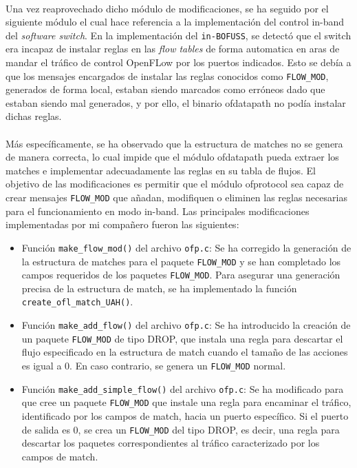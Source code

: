 \\
Una vez reaprovechado dicho módulo de modificaciones, se ha seguido por el siguiente módulo el cual hace referencia a la implementación del control in-band del \textit{software switch}. En la implementación del \texttt{in-BOFUSS}, se detectó que el switch era incapaz de instalar reglas en las \textit{flow tables} de forma automatica en aras de mandar el tráfico de control OpenFLow por los puertos indicados. Esto se debía a que los mensajes encargados de instalar las reglas conocidos como \texttt{FLOW\_MOD}, generados de forma local, estaban siendo marcados como erróneos dado que estaban siendo mal generados, y por ello, el binario ofdatapath no podía instalar dichas reglas.\\
\\
Más específicamente, se ha observado que la estructura de matches no se genera de manera correcta, lo cual impide que el módulo ofdatapath pueda extraer los matches e implementar adecuadamente las reglas en su tabla de flujos. El objetivo de las modificaciones es permitir que el módulo ofprotocol sea capaz de crear mensajes \texttt{FLOW\_MOD} que añadan, modifiquen o eliminen las reglas necesarias para el funcionamiento en modo in-band. Las principales modificaciones implementadas por mi compañero fueron las siguientes:

\begin{itemize}
    \item Función \texttt{make\_flow\_mod()} del archivo \texttt{ofp.c}: Se ha corregido la generación de la estructura de matches para el paquete \texttt{FLOW\_MOD} y se han completado los campos requeridos de los paquetes \texttt{FLOW\_MOD}. Para asegurar una generación precisa de la estructura de match, se ha implementado la función \texttt{create\_ofl\_match\_UAH()}.

    \item Función \texttt{make\_add\_flow()} del archivo \texttt{ofp.c}: Se ha introducido la creación de un paquete \texttt{FLOW\_MOD} de tipo DROP, que instala una regla para descartar el flujo especificado en la estructura de match cuando el tamaño de las acciones es igual a 0. En caso contrario, se genera un \texttt{FLOW\_MOD} normal.

    \item Función \texttt{make\_add\_simple\_flow()} del archivo \texttt{ofp.c}: Se ha modificado para que cree un paquete \texttt{FLOW\_MOD} que instale una regla para encaminar el tráfico, identificado por los campos de match, hacia un puerto específico. Si el puerto de salida es 0, se crea un \texttt{FLOW\_MOD} del tipo DROP, es decir, una regla para descartar los paquetes correspondientes al tráfico caracterizado por los campos de match.
\end{itemize}

